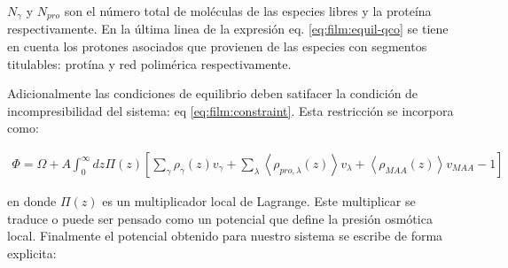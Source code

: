 \noindent $N_\gamma$ y $ N_{pro}$ son el n\'umero total de mol\'eculas de las especies libres y la prote\'ina respectivamente. En la \'ultima linea de la expresi\'on eq. \ref{eq:film:equil-qco} se tiene en cuenta los protones asociados que  provienen de las especies con segmentos titulables: prot\'ina y red polim\'erica respectivamente.


Adicionalmente las condiciones de equilibrio deben satifacer la condici\'on de incompresibilidad del sistema: eq \ref{eq:film:constraint}.  Esta restricci\'on se incorpora como:

\begin{align}
	\Phi = \Omega +A \int_0^\infty dz\Pi(z){\left[\sum_{\gamma}\rho_\gamma(z) v_\gamma + \sum_\lambda{\left<\rho_{pro,\lambda}(z)\right>v_\lambda} + \left<\rho_{MAA}(z)\right>v_{MAA} -1 \right]}
\end{align}


\noindent en donde $\Pi(z)$ es un multiplicador local de Lagrange.  Este multiplicar se traduce o puede ser pensado como un potencial que define la presi\'on osm\'otica local. Finalmente el potencial obtenido para nuestro sistema se escribe de forma explicita:
 
